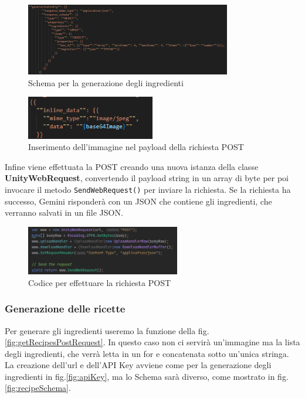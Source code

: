 \begin{figure}[H]
    \centering
    \includegraphics[width=0.8\textwidth,height=\textheight,keepaspectratio]{figures/chapter_1/StructuredOutput.png}
    \caption{Schema per la generazione degli ingredienti}
    \label{fig:structuredOutput}
\end{figure}
\begin{figure}[H]
    \centering
    \includegraphics[width=0.5\textwidth,height=\textheight,keepaspectratio]{figures/chapter_1/imagePayload.png}
    \caption{Inserimento dell'immagine nel payload della richiesta POST}
    \label{fig:imagePayload}
\end{figure}
Infine viene effettuata la POST creando una nuova istanza della classe \textbf{UnityWebRequest}, convertendo il payload string in un array di byte per poi invocare il metodo \texttt{SendWebRequest()} per inviare la richiesta. Se la richiesta ha successo, Gemini risponderà con un JSON che contiene gli ingredienti, che verranno salvati in un file JSON.
\begin{figure}[H]
    \centering
    \includegraphics[width=0.6\textwidth,height=\textheight,keepaspectratio]{figures/chapter_1/richiestaPOST.png}
    \caption{Codice per effettuare la richiesta POST}
    \label{fig:postRequest}
\end{figure}

\subsubsection{Generazione delle ricette}
Per generare gli ingredienti useremo la funzione della fig.\ref{fig:getRecipesPostRequest}. In questo caso non ci servirà un'immagine ma la lista degli ingredienti, che verrà letta in un for e concatenata sotto un'unica stringa. La creazione dell'url e dell'API Key avviene come per la generazione degli ingredienti in fig.\ref{fig:apiKey}, ma lo Schema sarà diverso, come mostrato in fig.\ref{fig:recipeSchema}.

